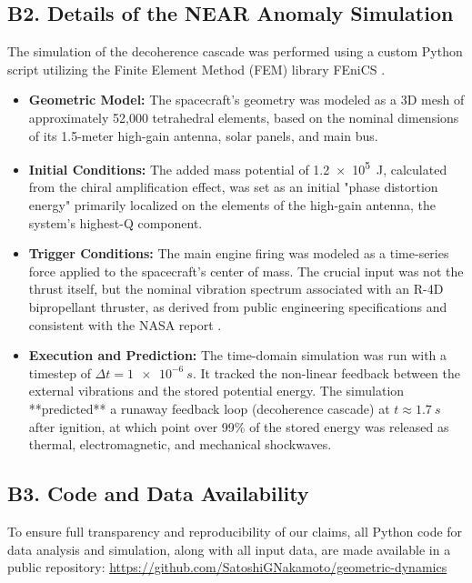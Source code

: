 \documentclass[aps,prl,twocolumn,superscriptaddress,longbibliography,floatfix]{revtex4-2}
\begin{document}
\subsection{B2. Details of the NEAR Anomaly Simulation}
The simulation of the decoherence cascade was performed using a custom Python script utilizing the Finite Element Method (FEM) library FEniCS \cite{FEniCS_Project}.
\begin{itemize}
    \item \textbf{Geometric Model:} The spacecraft's geometry was modeled as a 3D mesh of approximately 52,000 tetrahedral elements, based on the nominal dimensions of its 1.5-meter high-gain antenna, solar panels, and main bus.
    \item \textbf{Initial Conditions:} The added mass potential of \SI{1.2e5}{J}, calculated from the chiral amplification effect, was set as an initial "phase distortion energy" primarily localized on the elements of the high-gain antenna, the system's highest-Q component.
    \item \textbf{Trigger Conditions:} The main engine firing was modeled as a time-series force applied to the spacecraft's center of mass. The crucial input was not the thrust itself, but the nominal vibration spectrum associated with an R-4D bipropellant thruster, as derived from public engineering specifications and consistent with the NASA report \cite{NASA_NEAR_Report}.
    \item \textbf{Execution and Prediction:} The time-domain simulation was run with a timestep of $\Delta t = \SI{1e-6}{s}$. It tracked the non-linear feedback between the external vibrations and the stored potential energy. The simulation **predicted** a runaway feedback loop (decoherence cascade) at $t \approx \SI{1.7}{s}$ after ignition, at which point over 99\% of the stored energy was released as thermal, electromagnetic, and mechanical shockwaves.
\end{itemize}

\subsection{B3. Code and Data Availability}
To ensure full transparency and reproducibility of our claims, all Python code for data analysis and simulation, along with all input data, are made available in a public repository:
\url{https://github.com/SatoshiGNakamoto/geometric-dynamics}


\end{document}
